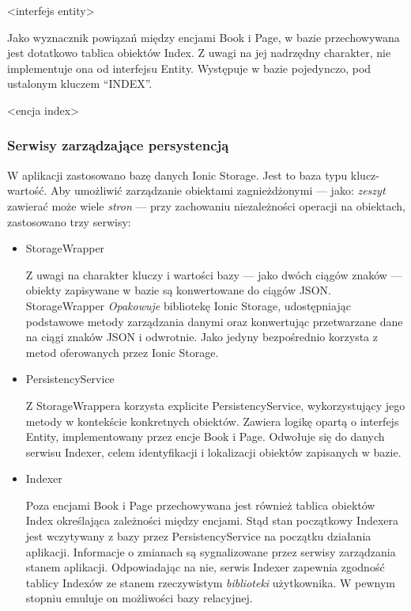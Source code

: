 <interfejs entity>

Jako wyznacznik powiązań między encjami Book i Page, w bazie przechowywana jest dotatkowo tablica obiektów Index.
Z uwagi na jej nadrzędny charakter, nie implementuje ona od interfejsu Entity. Występuje w bazie pojedynczo, pod ustalonym
kluczem \enquote{INDEX}.

<encja index>

\subsubsection{Serwisy zarządzające persystencją}
W aplikacji zastosowano bazę danych Ionic Storage. Jest to baza typu klucz-wartość. Aby umożliwić
zarządzanie obiektami zagnieżdżonymi — jako: \textit{zeszyt} zawierać może wiele \textit{stron} — przy zachowaniu
niezależności operacji na obiektach, zastosowano trzy serwisy:
\begin{itemize}
	\item StorageWrapper

	      Z uwagi na charakter kluczy i wartości bazy — jako dwóch ciągów znaków — obiekty zapisywane w bazie są
	      konwertowane do ciągów JSON. StorageWrapper \textit{Opakowuje} bibliotekę Ionic Storage, udostępniając podstawowe
	      metody zarządzania danymi oraz konwertując przetwarzane dane na ciągi znaków JSON i odwrotnie.
	      Jako jedyny bezpośrednio korzysta z metod oferowanych przez Ionic Storage.
	\item PersistencyService

	      Z StorageWrappera korzysta explicite PersistencyService, wykorzystujący jego metody w kontekście konkretnych obiektów.
	      Zawiera logikę opartą o interfejs Entity, implementowany przez encje Book i Page. Odwołuje się do danych
	      serwisu Indexer, celem identyfikacji i lokalizacji obiektów zapisanych w bazie.
	\item Indexer

	      Poza encjami Book i Page przechowywana jest również tablica obiektów Index określająca
	      zależności między encjami. Stąd stan początkowy Indexera jest wczytywany z bazy przez PersistencyService
	      na początku działania aplikacji.
	      Informacje o zmianach są sygnalizowane przez serwisy zarządzania stanem aplikacji.
	      Odpowiadając na nie, serwis Indexer zapewnia zgodność tablicy Indexów ze stanem rzeczywistym
	      \textit{biblioteki} użytkownika. W pewnym stopniu emuluje on możliwości bazy relacyjnej.
\end{itemize}

